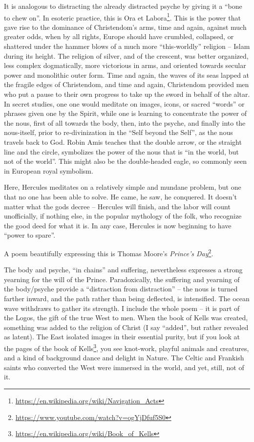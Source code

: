 It is analogous to distracting the already distracted psyche by giving it a ``bone to chew on''. In esoteric practice, this is Ora et Labora\footnote{\url{https://en.wikipedia.org/wiki/Navigation\_Acts}}. This is the power that gave rise to the dominance of Christendom's arms, time and again, against much greater odds, when by all rights, Europe should have crumbled, collapsed, or shattered under the hammer blows of a much more ``this-worldly'' religion -- Islam during its height. The religion of silver, and of the crescent, was better organized, less complex dogmatically, more victorious in arms, and oriented towards secular power and monolithic outer form. Time and again, the waves of its seas lapped at the fragile edges of Christendom, and time and again, Christendom provided men who put a pause to their own progress to take up the sword in behalf of the altar. In secret studies, one one would meditate on images, icons, or sacred ``words'' or phrases given one by the Spirit, while one is learning to concentrate the power of the nous, first of all towards the body, then, into the psyche, and finally into the nous-itself, prior to re-divinization in the ``Self beyond the Self'', as the nous travels back to God. Robin Amis teaches that the double arrow, or the straight line and the circle, symbolizes the power of the nous that is ``in the world, but not of the world''. This might also be the double-headed eagle, so commonly seen in European royal symbolism.

Here, Hercules meditates on a relatively simple and mundane problem, but one that no one has been able to solve. He came, he saw, he conquered. It doesn't matter what the gods decree -- Hercules will finish, and the labor will count unofficially, if nothing else, in the popular mythology of the folk, who recognize the good deed for what it is. In any case, Hercules is now beginning to have ``power to spare''.

A poem beautifully expressing this is Thomas Moore's \emph{Prince's Day}\footnote{\url{https://www.youtube.com/watch?v=ogYjDfuf5S0}}.

The body and psyche, ``in chains'' and suffering, nevertheless expresses a strong yearning for the will of the Prince. Paradoxically, the suffering and yearning of the body/psyche provide a ``distraction from distraction'' -- the nous is turned farther inward, and the path rather than being deflected, is intensified. The ocean wave withdraws to gather its strength. I include the whole poem -- it is part of the Logos, the gift of the true West to men. When the book of Kells was created, something was added to the religion of Christ (I say ``added'', but rather revealed as latent). The East isolated images in their essential purity, but if you look at the pages of the book of Kells\footnote{\url{https://en.wikipedia.org/wiki/Book\_of\_Kells}}, you see knot-work, playful animals and creatures, and a kind of background dance and delight in Nature. The Celtic and Frankish saints who converted the West were immersed in the world, and yet, still, not of it.

